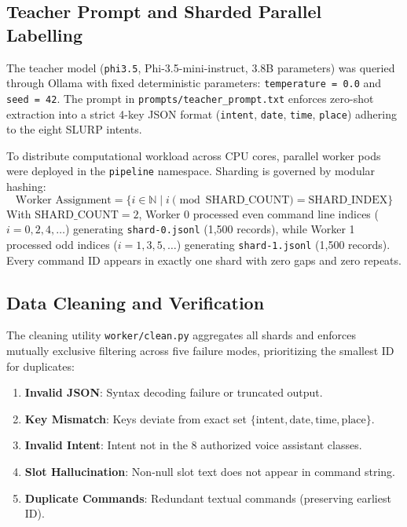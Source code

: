 \documentclass[10pt,a4paper]{article}
\begin{document}
\subsection{Teacher Prompt and Sharded Parallel Labelling}
The teacher model (\texttt{phi3.5}, Phi-3.5-mini-instruct, 3.8B parameters) was queried through Ollama with fixed deterministic parameters: \texttt{temperature = 0.0} and \texttt{seed = 42}. The prompt in \texttt{prompts/teacher\_prompt.txt} enforces zero-shot extraction into a strict 4-key JSON format (\texttt{intent}, \texttt{date}, \texttt{time}, \texttt{place}) adhering to the eight SLURP intents.

To distribute computational workload across CPU cores, parallel worker pods were deployed in the \texttt{pipeline} namespace. Sharding is governed by modular hashing:
\begin{equation}
    \text{Worker Assignment} = \{ i \in \mathbb{N} \mid i \pmod{\text{SHARD\_COUNT}} = \text{SHARD\_INDEX} \}
\end{equation}
With $\text{SHARD\_COUNT}=2$, Worker 0 processed even command line indices ($i=0, 2, 4, \dots$) generating \texttt{shard-0.jsonl} (1,500 records), while Worker 1 processed odd indices ($i=1, 3, 5, \dots$) generating \texttt{shard-1.jsonl} (1,500 records). Every command ID appears in exactly one shard with zero gaps and zero repeats.

\subsection{Data Cleaning and Verification}
The cleaning utility \texttt{worker/clean.py} aggregates all shards and enforces mutually exclusive filtering across five failure modes, prioritizing the smallest ID for duplicates:
\begin{enumerate}\setlength\itemsep{0em}
    \item[(a)] \textbf{Invalid JSON}: Syntax decoding failure or truncated output.
    \item[(b)] \textbf{Key Mismatch}: Keys deviate from exact set $\{\text{intent}, \text{date}, \text{time}, \text{place}\}$.
    \item[(c)] \textbf{Invalid Intent}: Intent not in the 8 authorized voice assistant classes.
    \item[(d)] \textbf{Slot Hallucination}: Non-null slot text does not appear in command string.
    \item[(e)] \textbf{Duplicate Commands}: Redundant textual commands (preserving earliest ID).
\end{enumerate}
\end{document}
